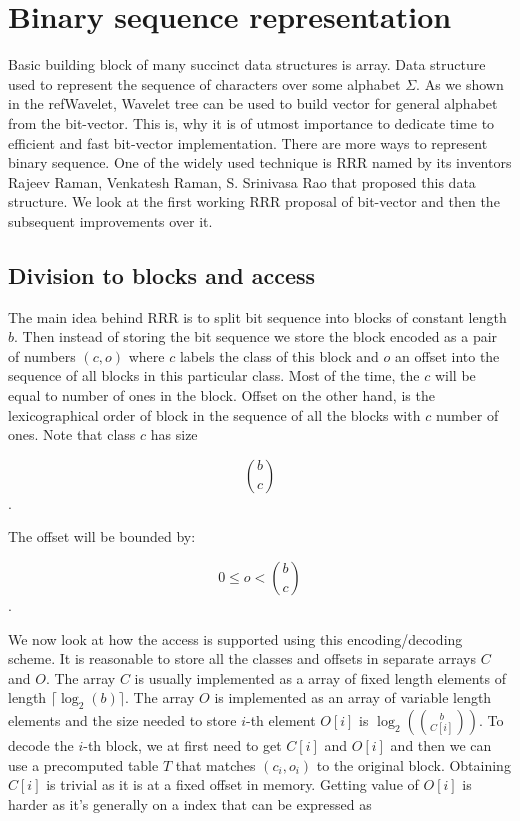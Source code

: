 \chapter{Binary sequence representation}
\label{kap:kap2}

Basic building block of many succinct data structures is array. Data structure
used to represent the sequence of characters over some alphabet $\Sigma$. As we
shown in the refWavelet, Wavelet tree can be used to build vector for general
alphabet from the bit-vector. This is, why it is of utmost importance to dedicate
time to efficient and fast bit-vector implementation. There are more ways to represent
binary sequence. One of the widely used technique is RRR named by its inventors
Rajeev Raman, Venkatesh Raman, S. Srinivasa Rao that proposed this data structure.
We look at the first working RRR proposal of bit-vector and then the subsequent
improvements over it.

\section{Division to blocks and access}

The main idea behind RRR is to split bit sequence into blocks of constant length $b$.
Then instead of storing the bit sequence we store the block encoded as a pair of
numbers $(c, o)$ where $c$ labels the class of this block and $o$ an offset into
the sequence of all blocks in this particular class. Most of the time, the $c$
will be equal to number of ones in the block. Offset on the other hand, is the
lexicographical order of block in the sequence of all the blocks with $c$ number
of ones. Note that class $c$ has size

                    $${b\choose c}$$.

The offset will be bounded by:

					$$0 \leq o < {b\choose c}$$.

We now look at how the access is supported using this encoding/decoding scheme.
It is reasonable to store all the classes and offsets in separate arrays $C$ and
$O$. The array $C$ is usually implemented as a array of fixed length elements of
length $\lceil \log_2(b)\rceil$. The array $O$ is implemented as an array of
variable length elements and the size needed to store $i$-th element $O[i]$ is
$\log_2({b\choose C[i]})$. To decode the $i$-th block, we at first need to get
$C[i]$ and $O[i]$ and then we can use a precomputed table $T$ that matches $(c_i, o_i)$
to the original block. Obtaining $C[i]$ is trivial as it is at a fixed offset in
memory. Getting value of $O[i]$ is harder as it's generally on a index that can
be expressed as

